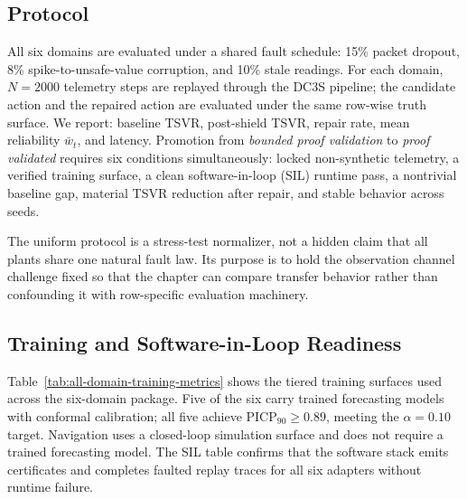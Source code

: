 \subsection{Protocol}

All six domains are evaluated under a shared fault schedule: 15\%
packet dropout, 8\% spike-to-unsafe-value corruption, and 10\% stale
readings.  For each domain, $N = 2000$ telemetry steps are replayed
through the DC3S pipeline; the candidate action and the repaired action
are evaluated under the same row-wise truth surface.  We report:
baseline TSVR, post-shield TSVR, repair rate, mean reliability
$\bar{w}_t$, and latency.  Promotion from \emph{bounded proof validation} to
\emph{proof validated} requires six conditions simultaneously: locked
non-synthetic telemetry, a verified training surface, a clean
software-in-loop (SIL) runtime pass, a nontrivial baseline gap, material
TSVR reduction after repair, and stable behavior across seeds.

The uniform protocol is a stress-test normalizer, not a hidden claim that all
plants share one natural fault law.  Its purpose is to hold the observation
channel challenge fixed so that the chapter can compare transfer behavior
rather than confounding it with row-specific evaluation machinery.

\subsection{Training and Software-in-Loop Readiness}



Table~\ref{tab:all-domain-training-metrics} shows the tiered training
surfaces used across the six-domain package.  Five of the six carry
trained forecasting models with conformal calibration; all five achieve
PICP$_{90} \geq 0.89$, meeting the $\alpha = 0.10$ target.  Navigation
uses a closed-loop simulation surface and does not require a trained
forecasting model.  The SIL table confirms that the software stack
emits certificates and completes faulted replay traces for all six adapters
without runtime failure.

